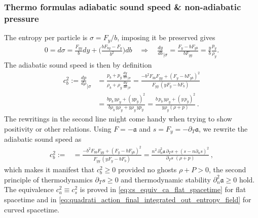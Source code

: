 \subsubsection{Thermo formulas adiabatic sound speed \& non-adiabatic pressure}

The entropy per particle is $\sigma=F_y/b$, imposing it be preserved gives
\begin{align}
    0=d\sigma = \frac{F_{yy}}{b}dy+\Big(\frac{bF_{by}-F_y}{b^2}\Big)db\quad \Rightarrow\quad \frac{dy}{db}_{\mid\sigma}= \frac{F_y-b F_{yb}}{bF_{yy}}=\frac{y}{b}\frac{p_y}{\rho_y}.
\end{align}
The adiabatic sound speed is then by definition
\begin{align}
    c_b^2:=\frac{dp}{d\rho}_{\mid\sigma}&=\frac{p_b + p_y\, \tfrac{dy}{db}_{\mid\sigma}}{\rho_b + \rho_y\, \tfrac{dy}{db}_{\mid\sigma}} 
    =\frac{-b^2F_{bb} F_{yy}+(F_y-bF_{yb})^2}{F_{yy}\,(yF_y-bF_b)}\\[5pt]
    &= \frac{b p_b\, y\rho_y+(yp_y)^2}{b\rho_b\,y\rho_y+y\rho_y\,yp_y} = \frac{b\,p_b \,y\rho_y + (y\,p_y)^2}{y \rho_y (\rho+p)}\,.
\end{align}
The rewritings in the second line might come handy when trying to show positivity or other relations.
Using $F=-\mathfrak{a}$ and $s=F_y=-\partial_T\mathfrak{a}$, we rewrite the adiabatic sound speed as
\begin{align}
    c_b^2:=
    &=\frac{-b^2F_{bb} F_{yy}+(F_y-bF_{yb})^2}{F_{yy}\,(yF_y-bF_b)} = \frac{n^2\,\partial_n^2\mathfrak{a}\,\partial_Ts + (s-n\partial_ns)^2}{\partial_Ts\,\,(\rho+p)}\,,
\end{align}
which makes it manifest that $c_b^2\geq0$ provided no ghosts $\rho+P>0$, the second principle of thermodynamics $\partial_Ts\geq 0$ and thermodynamic stability $\partial_n^2\mathfrak{a}\geq 0$ hold.
The equivalence $c_a^2\equiv c_s^2$ is proved in \eqref{eq:cs_equiv_ca_flat_spacetime} for flat spacetime and in \eqref{eq:quadrati_action_final_integrated_out_entropy_field} for curved spacetime.

